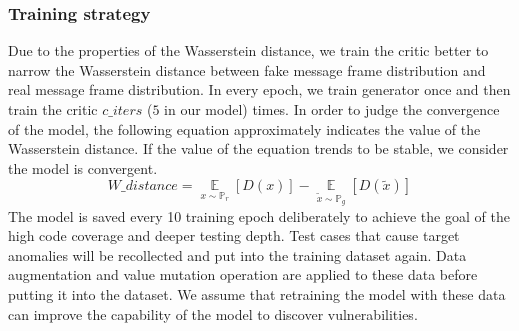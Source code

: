 \subsubsection{\textbf{Training strategy}}
Due to the properties of the Wasserstein distance, we train the critic better to narrow the Wasserstein distance between fake message frame distribution and real message frame distribution. %
In every epoch, we train generator once and then train the critic $c\_iters$ ($5$ in our model) times. %
In order to judge the convergence of the model, the following equation approximately indicates the value of the Wasserstein distance. If the value of the equation trends to be stable, we consider the model is convergent.
\begin{equation}
W\_distance = 
\mathop{\mathbb{E}}\limits_{x\sim\mathbb{P}_{r}}\left [ D(x) \right ] 
- \mathop{\mathbb{E}}\limits_{\tilde{x}\sim\mathbb{P}_{g}}\left [ D(\tilde{x}) \right ] 
\end{equation}
The model is saved every 10 training epoch deliberately to achieve the goal of the high code coverage and deeper testing depth. Test cases that cause target anomalies will be recollected and put into the training dataset again. Data augmentation and value mutation operation are applied to these data before putting it into the dataset. We assume that retraining the model with these data can improve the capability of the model to discover vulnerabilities.


